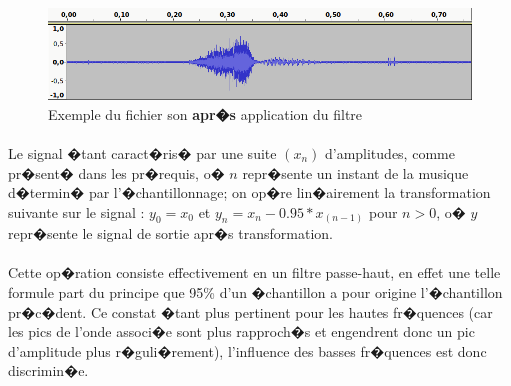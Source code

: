 \begin{figure}[H]
	    \begin{center}
		    \includegraphics[width=15cm]{Images/passehautapres.png} 
	    \end{center}
	    \caption{Exemple du fichier son \textbf{apr�s} application du filtre}
\end{figure}
\paragraph{}
	Le signal �tant caract�ris� par une suite $(x_n)$ 
	d'amplitudes, comme pr�sent� dans les pr�requis, o� $n$ repr�sente un instant de la musique d�termin� par l'�chantillonnage; 
	on op�re lin�airement la transformation suivante sur le signal : $y_0 = x_0$ et $y_n = x_n - 0.95*x_{(n-1)}$  pour $n > 0$, 
	o� $y$ repr�sente le signal de sortie apr�s transformation.
\paragraph{}
	Cette op�ration consiste effectivement en un filtre passe-haut, en effet une telle formule part du principe que 95\% d'un 
	�chantillon a pour origine l'�chantillon pr�c�dent. Ce constat �tant plus pertinent pour les hautes fr�quences (car les 
	pics de l'onde associ�e sont plus rapproch�s et engendrent donc un pic d'amplitude plus r�guli�rement), l'influence des basses fr�quences est donc discrimin�e. 
	
